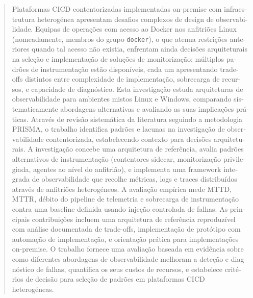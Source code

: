 \begin{otherlanguage}{portuguese}
\begin{abstract}

Plataformas \ac{CICD} contentorizadas implementadas on-premise com infraestrutura heterogénea apresentam desafios complexos de design de observabilidade. Equipas de operações com acesso ao Docker nos anfitriões Linux (nomeadamente, membros do grupo \texttt{docker}), o que atenua restrições anteriores quando tal acesso não existia, enfrentam ainda decisões arquiteturais na seleção e implementação de soluções de monitorização: múltiplos padrões de instrumentação estão disponíveis, cada um apresentando trade-offs distintos entre complexidade de implementação, sobrecarga de recursos, e capacidade de diagnóstico. Esta investigação estuda arquiteturas de observabilidade para ambientes mistos Linux e Windows, comparando sistematicamente abordagens alternativas e avaliando as suas implicações práticas. Através de revisão sistemática da literatura seguindo a metodologia \ac{PRISMA}, o trabalho identifica padrões e lacunas na investigação de observabilidade contentorizada, estabelecendo contexto para decisões arquiteturais. A investigação concebe uma arquitetura de referência, avalia padrões alternativos de instrumentação (contentores sidecar, monitorização privilegiada, agentes ao nível do anfitrião), e implementa uma framework integrada de observabilidade que recolhe métricas, logs e traces distribuídos através de anfitriões heterogéneos. A avaliação empírica mede \ac{MTTD}, \ac{MTTR}, débito do pipeline de telemetria e sobrecarga de instrumentação contra uma baseline definida usando injeção controlada de falhas. As principais contribuições incluem uma arquitetura de referência reproduzível com análise documentada de trade-offs, implementação de protótipo com automação de implementação, e orientação prática para implementações on-premise. O trabalho fornece uma avaliação baseada em evidência sobre como diferentes abordagens de observabilidade melhoram a deteção e diagnóstico de falhas, quantifica os seus custos de recursos, e estabelece critérios de decisão para seleção de padrões em plataformas \ac{CICD} heterogéneas.
\end{abstract}
\end{otherlanguage}



